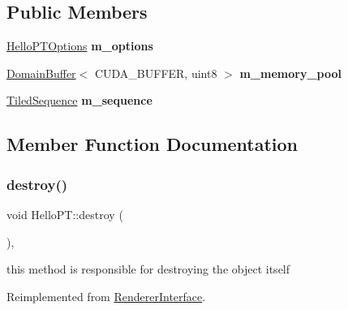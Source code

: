 \subsection*{Public Members}
\begin{DoxyCompactItemize}
\item 
\mbox{\label{struct_hello_p_t_a2e7ca0c493562e157984ce410b86509e}} 
\hyperlink{struct_hello_p_t_options}{Hello\+P\+T\+Options} {\bfseries m\+\_\+options}
\item 
\mbox{\label{struct_hello_p_t_a82179262319c026678ae4f7ed8a706d8}} 
\hyperlink{class_domain_buffer}{Domain\+Buffer}$<$ C\+U\+D\+A\+\_\+\+B\+U\+F\+F\+ER, uint8 $>$ {\bfseries m\+\_\+memory\+\_\+pool}
\item 
\mbox{\label{struct_hello_p_t_ad14d0897040544317b951e59c6657fd5}} 
\hyperlink{struct_tiled_sequence}{Tiled\+Sequence} {\bfseries m\+\_\+sequence}
\end{DoxyCompactItemize}


\subsection{Member Function Documentation}
\mbox{\label{struct_hello_p_t_ac81e09dcfb28dffc85aa6c4df06a4426}} 
\subsubsection{\texorpdfstring{destroy()}{destroy()}}
{\footnotesize\ttfamily void Hello\+P\+T\+::destroy (\begin{DoxyParamCaption}{ }\end{DoxyParamCaption})\hspace{0.3cm}{\ttfamily [inline]}, {\ttfamily [virtual]}}

this method is responsible for destroying the object itself 

Reimplemented from \hyperlink{struct_renderer_interface_a7469218aafa029a3e22bac2c00dca9f5}{Renderer\+Interface}.

\mbox{\label{struct_hello_p_t_a8ec59e3fac8eff801cecdd3220cd8d41}} 
